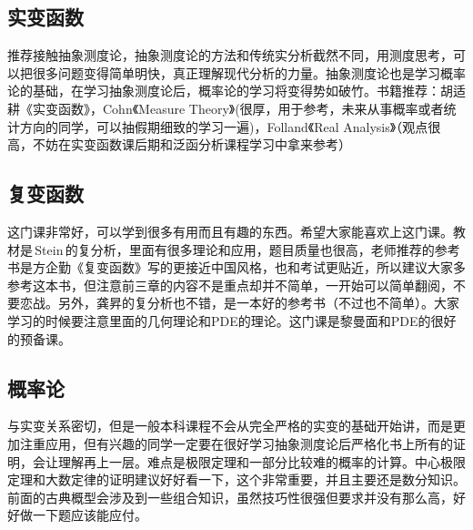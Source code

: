 \subsection{实变函数}

推荐接触抽象测度论，抽象测度论的方法和传统实分析截然不同，用测度思考，可以把很多问题变得简单明快，真正理解现代分析的力量。抽象测度论也是学习概率论的基础，在学习抽象测度论后，概率论的学习将变得势如破竹。书籍推荐：胡适耕《实变函数》，Cohn《Measure Theory》(很厚，用于参考，未来从事概率或者统计方向的同学，可以抽假期细致的学习一遍)，Folland《Real Analysis》（观点很高，不妨在实变函数课后期和泛函分析课程学习中拿来参考）


\subsection{复变函数}
这门课非常好，可以学到很多有用而且有趣的东西。希望大家能喜欢上这门课。教材是\,Stein\,的复分析，里面有很多理论和应用，题目质量也很高，老师推荐的参考书是方企勤《复变函数》写的更接近中国风格，也和考试更贴近，所以建议大家多参考这本书，但注意前三章的内容不是重点却并不简单，一开始可以简单翻阅，不要恋战。另外，龚昇的复分析也不错，是一本好的参考书（不过也不简单）。大家学习的时候要注意里面的几何理论和PDE的理论。这门课是黎曼面和PDE的很好的预备课。
\subsection{概率论}
与实变关系密切，但是一般本科课程不会从完全严格的实变的基础开始讲，而是更加注重应用，但有兴趣的同学一定要在很好学习抽象测度论后严格化书上所有的证明，会让理解再上一层。难点是极限定理和一部分比较难的概率的计算。中心极限定理和大数定律的证明建议好好看一下，这个非常重要，并且主要还是数分知识。前面的古典概型会涉及到一些组合知识，虽然技巧性很强但要求并没有那么高，好好做一下题应该能应付。

